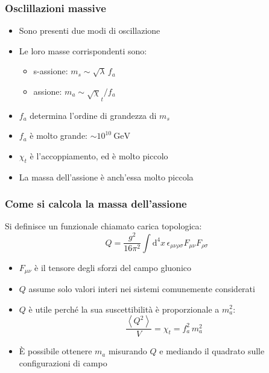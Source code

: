\begin{frame}
    \frametitle{Osclillazioni massive}
    \begin{itemize}
        \item Sono presenti due modi di oscillazione
        \item Le loro masse corrispondenti sono:
            \begin{itemize}
                \item s-assione: $m_s \sim \sqrt\lambda\,f_a$
                \item assione: $m_a \sim \sqrt\chi_t/f_a$
            \end{itemize}
        \item $f_a$ determina l'ordine di grandezza di $m_s$
        \item $f_a$ è molto grande: $\sim 10^{10}\ \text{GeV}$
        \item $\chi_t$ è l'accoppiamento, ed è molto piccolo
        \item La massa dell'assione è anch'essa molto piccola
    \end{itemize}
\end{frame}

\begin{frame}
    \frametitle{Come si calcola la massa dell'assione}
    Si definisce un funzionale chiamato {\color{fzjblue} carica topologica}:
    $$Q = \frac{g^2}{16\pi^2}\int\mathrm{d}^4x\,%
    \epsilon_{\mu\nu\rho\sigma}F_{\mu\nu}F_{\rho\sigma}$$
    \begin{itemize}
        \item $F_{\mu\nu}$ è il tensore degli sforzi del campo gluonico
        \item $Q$ assume solo valori interi nei sistemi comunemente considerati
        \item $Q$ è utile perché la sua suscettibilità è proporzionale a $m_a^2$:
            $$\frac{\left<Q^2\right>}{V}=\chi_t=f_a^2\,m_a^2$$
        \item È possibile ottenere $m_a$ misurando $Q$ %
            e mediando il quadrato sulle configurazioni di campo
    \end{itemize}
\end{frame}

